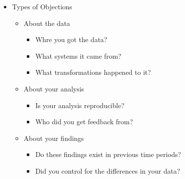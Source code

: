 \documentclass[a4paper]{article}
\begin{document}
\begin{itemize}
        \item Types of Objections
            \begin{itemize}
                \item About the data 
                    \begin{itemize}
                        \item Whre you got the data? 
                        \item What systems it came from? 
                        \item What transformations happened to it?
                    \end{itemize}
                
                    \item About your analysis 
                    \begin{itemize}
                        \item Is your analysis reproducible?
                        \item Who did you get feedback from?
                    \end{itemize}

                \item About your findings
                    \begin{itemize}
                        \item Do these findings exist in previous time periods?
                        \item Did you control for the differences in your data?
                    \end{itemize}

            \end{itemize}




    \end{itemize}





    
\end{document}
